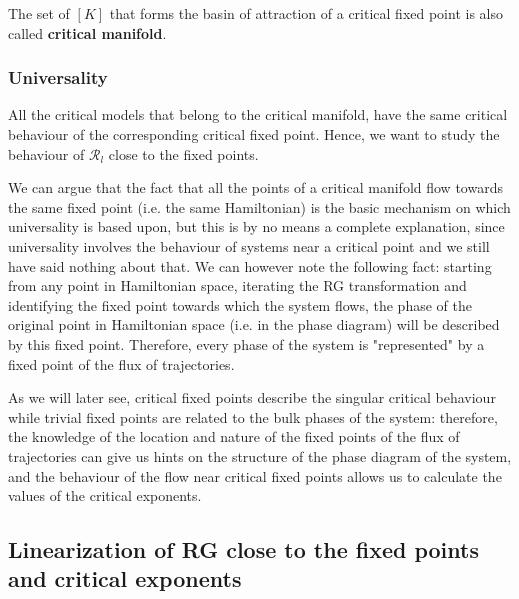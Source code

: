 \documentclass[../main/main.tex]{subfiles}
\begin{document}
The set of \( [K] \) that forms the basin of attraction of a critical fixed point is also called \textbf{critical manifold}.

\subsubsection{Universality}

All the critical models that belong to the critical manifold, have the same critical behaviour of the corresponding critical fixed point. Hence, we want to study the behaviour of \( \mathcal{R}_l \) close to the fixed points.

 We can argue that the fact that all the points of a critical manifold flow towards the same fixed point (i.e. the same Hamiltonian) is the basic mechanism on which universality is based upon, but this is by no means a complete explanation, since universality involves the behaviour of systems near a critical point and we still have said nothing about that. We can however note the following fact: starting from any point in Hamiltonian space, iterating the RG transformation and identifying the fixed point towards which the system flows, the phase of the original point in Hamiltonian space (i.e. in the phase diagram) will be described by this fixed point. Therefore, every phase of the system is "represented" by a fixed point of the flux of trajectories.


As we will later see, critical fixed points describe the singular critical behaviour while trivial fixed points are related to the bulk phases of the system: therefore, the knowledge of the location and nature of the fixed points of the flux of trajectories can give us hints on the structure of the phase diagram of the system, and the behaviour of the flow near critical fixed points allows us to calculate the values of the critical exponents.




\subsection{Linearization of RG close to the fixed points and critical exponents}
\end{document}
